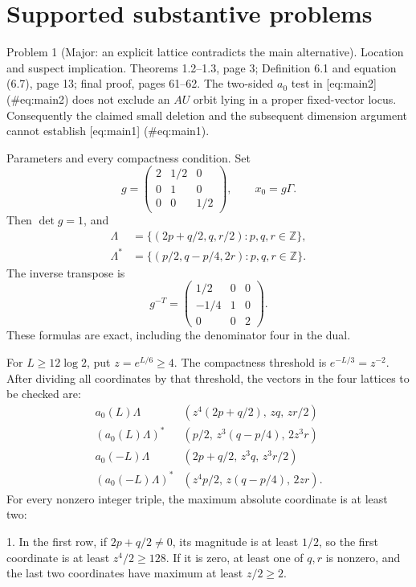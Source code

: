 \documentclass[10pt]{article}
\begin{document}
\section*{Supported substantive problems}
Problem 1 (Major: an explicit lattice contradicts the main alternative).  Location and suspect implication. Theorems 1.2–1.3, page 3; Definition 6.1 and equation (6.7), page 13; final proof, pages 61–62. The two-sided \(a_0\) test in [eq:main2] (\#eq:main2) does not exclude an \(AU\) orbit lying in a proper fixed-vector locus. Consequently the claimed small deletion and the subsequent dimension argument cannot establish [eq:main1] (\#eq:main1).\par
Parameters and every compactness condition. Set \[g=\begin{pmatrix}2&1/2&0\\0&1&0\\0&0&1/2\end{pmatrix},
 \qquad x_0=g\Gamma.\] Then \(\det g=1\), and \[\begin{aligned}
 \Lambda&=\{(2p+q/2,q,r/2):p,q,r\in\mathbb Z\},\\
 \Lambda^*&=\{(p/2,q-p/4,2r):p,q,r\in\mathbb Z\}.\end{aligned}\] The inverse transpose is \[g^{-T}=\begin{pmatrix}1/2&0&0\\-1/4&1&0\\0&0&2\end{pmatrix}.\] These formulas are exact, including the denominator four in the dual.\par
For \(L\geq12\log2\), put \(z=e^{L/6}\geq4\). The compactness threshold is \(e^{-L/3}=z^{-2}\). After dividing all coordinates by that threshold, the vectors in the four lattices to be checked are: \[\begin{array}{c|c}
 a_0(L)\Lambda &(z^4(2p+q/2),\,zq,\,zr/2)\\
 (a_0(L)\Lambda)^* &(p/2,\,z^3(q-p/4),\,2z^3r)\\
 a_0(-L)\Lambda &(2p+q/2,\,z^3q,\,z^3r/2)\\
 (a_0(-L)\Lambda)^* &(z^4p/2,\,z(q-p/4),\,2zr).
\end{array}\] For every nonzero integer triple, the maximum absolute coordinate is at least two:\par
1. In the first row, if \(2p+q/2\ne0\), its magnitude is at least \(1/2\), so the first coordinate is at least \(z^4/2\geq128\). If it is zero, at least one of \(q,r\) is nonzero, and the last two coordinates have maximum at least \(z/2\geq2\).\par
\end{document}
